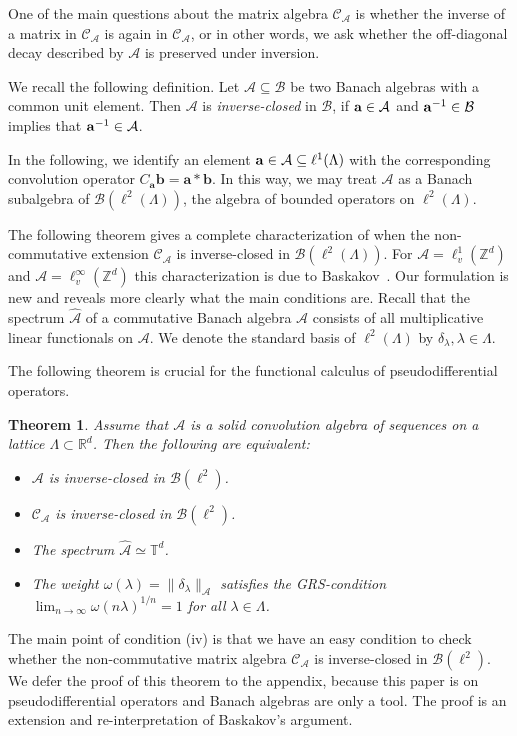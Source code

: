 \documentclass[12pt]{amsart}
\newtheorem{theorem}{Theorem}[section]
\theoremstyle{definition}
\theoremstyle{remark}
\numberwithin{equation}{section}
\newcommand{\psdo}{pseudodifferential operator}
\def\cB{\mathcal{B}}
\def\cA{\mathcal{A}}
\def\cC{\mathcal{C}}
\def\bR{{\mathbb{R}}}
\def\bZ{{\mathbb{Z}}}
\def\bT{{\mathbb{T}}}
\def\cca{\Cal C_\ac}
\def\rd{\bR^d}
\def\zd{\bZ^d}
\def\inv{^{-1}}
\def\cB{\mathcal{B}}
\def\cA{\mathcal{A}}
\def\cC{\mathcal{C}}
\newcommand{\bba}{{\bf a}}
\newcommand{\Cal}{\mathcal}
\newcommand{\La}{\Lambda}
\newcommand{\ac}{\Cal A}
\begin{document}
One of the main questions about the matrix algebra $\cca $ is
whether
the inverse of a matrix in $\cca $ is again in $\cca $, or in
other
words, we ask whether the off-diagonal decay  described by $\cA $
is
preserved under inversion.

We recall the following definition. Let $\cA \subseteq \cB $ be
two Banach algebras with a common unit element. Then $\cA $ is
\emph{inverse-closed} in $\cB $, if $\bba\in \cA $ and $\bba\inv
\in \cB
$
implies that $\bba\inv \in \cA $.

In the following, we identify an  element $\bba\in \cA \subseteq
\ell ^1(\Lambda )$ with the corresponding convolution operator
$C_\mathbf{a} \mathbf{b} = \mathbf{a} \ast \mathbf{b}$. In this
way, we may treat $\cA $ as a Banach subalgebra of $\cB (\ell
^2(\Lambda ))$, the algebra of  bounded operators on $\ell
^2(\Lambda )$.


The following theorem gives a complete characterization  of  when
the non-commutative extension $\cca $ is inverse-closed in
 $\cB (\ell ^2(\La ))$.  For $\cA = \ell ^1_v(\zd)$ and
 $\cA = \ell ^\infty _v(\zd)$ this
characterization is due to %
 Baskakov~\cite{Bas90}. %
Our formulation is new and reveals more clearly what the main
conditions are. %
Recall that the spectrum $\widehat{\cA }$ of a
commutative Banach algebra $\cA $ consists of all multiplicative
linear functionals on $\cA $. We denote the standard basis of $\ell
^2(\Lambda )$ by $\delta _\lambda , \lambda \in \Lambda $. 

The following theorem is crucial for the functional calculus of
\psdo s.

\begin{theorem} \label{bask}
Assume that $\cA $ is a solid convolution algebra of sequences on
a lattice $\Lambda\subset \rd $. Then the following are
equivalent:
\begin{itemize}

  \item[(i)] $\cA $ is inverse-closed in $\cB (\ell^2)$.

  \item[(ii)] $\cca $ is inverse-closed in $\cB (\ell^2)$.

  \item[(iii)] The spectrum $\widehat{\cA }\simeq \bT^d $.

  \item[(iv)] The weight $\omega (\lambda ) = \|\delta _\lambda \|_\cA
    $ satisfies the GRS-condition $\lim _{n\to \infty } \omega
    (n\lambda )^{1/n} = 1$ for all $\lambda \in \Lambda $. 
  \end{itemize}
\end{theorem}
The main point of condition (iv) is that we have an easy condition to
check whether the non-commutative matrix algebra $\cC _{\cA }$ is
inverse-closed in $\cB (\ell ^2)$. 
We defer the proof of this theorem to the appendix, because  this
paper is on \psdo s and Banach algebras are only a tool. The proof
is
an extension and re-interpretation of Baskakov's argument.%
\end{document}
